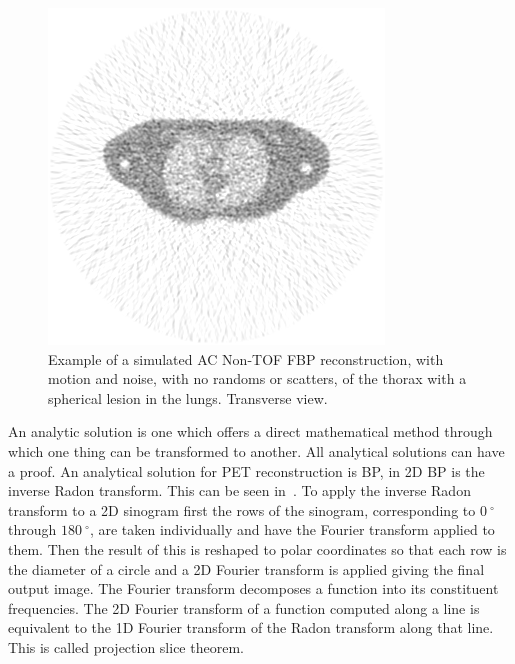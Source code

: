             \begin{figure}
                \centering
                
                \includegraphics[width=1.0\linewidth]{figures/background_fbp_example.png}
                
                \captionsetup{singlelinecheck=false, justification=raggedright}
                \caption{Example of a simulated \gls{AC} \gls{Non-TOF} \gls{FBP} reconstruction, with motion and noise, with no randoms or scatters, of the thorax with a spherical lesion in the lungs. Transverse view.}
                \label{fig:analytic_image_reconstruction_fbp_example}
            \end{figure}
            
            An analytic solution is one which offers a direct mathematical method through which one thing can be transformed to another. All analytical solutions can have a proof. An analytical solution for \gls{PET} reconstruction is \gls{BP}, in \gls{2D} \gls{BP} is the inverse Radon transform. This can be seen in~. To apply the inverse Radon transform to a \gls{2D} sinogram first the rows of the sinogram, corresponding to $\SI{0}{^{\circ}}$ through $\SI{180}{^{\circ}}$, are taken individually and have the Fourier transform applied to them. Then the result of this is reshaped to polar coordinates so that each row is the diameter of a circle and a \gls{2D} Fourier transform is applied giving the final output image. The Fourier transform decomposes a function into its constituent frequencies. The \gls{2D} Fourier transform of a function computed along a line is equivalent to the 1D Fourier transform of the Radon transform along that line. This is called projection slice theorem. 
            
